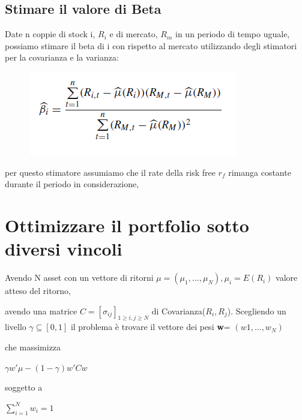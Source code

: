 \documentclass[a4paper,11pt]{report}
\begin{document}
{\subsection{Stimare il  valore di Beta}
	Date n coppie di stock i, $R_i$ e di mercato, $R_m$ in un periodo di tempo uguale, possiamo stimare il beta di i con rispetto al mercato utilizzando degli stimatori per la covarianza e la varianza:
\begin{figure}[h]
  \includegraphics[width=\linewidth]{TheBigBetaFormula.png}
  \label{fig:betaformula}
\end{figure}	
	\newline per questo stimatore assumiamo che il rate della risk free $r_f$ rimanga costante durante il periodo in considerazione,  \newline 

\newpage
 
\section{Ottimizzare il portfolio sotto diversi vincoli}
	Avendo N asset con un vettore di ritorni $\mu=(\mu_1,...,\mu_N), \mu_i=E(R_i)$ valore atteso del ritorno,

	avendo una matrice $C=[\sigma_{ij}]_{1\geq i, j \geq N} $ di Covarianza($R_i,R_j$). \newline
	Scegliendo un livello $\gamma \subseteq [0,1]$ il problema è trovare il vettore dei pesi \textbf{w}= $(w1,...,w_N)$

	che massimizza
\begin{center}
	$\gamma w' \mu -(1-\gamma)w'Cw$
\end{center}
	soggetto a
\begin{center}
	$\sum\limits_{i=1}^N w_i=1$
\end{center}
}
\end{document}

